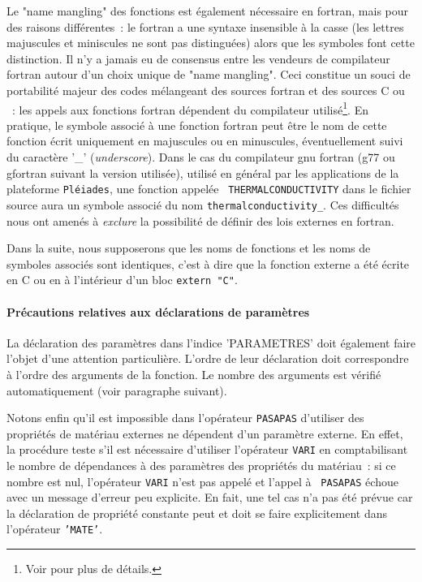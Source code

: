\documentclass[rectoverso,pleiades,pstricks,leqno,anti]{texmf/note_technique_2010}
\def\ifmonospace{\ifdim\fontdimen3\font=0pt }
\def\cpp{%
\ifmonospace%
    C++%
\else%
    C\kern-.1667em\raise.30ex\hbox{\smaller{++}}%
\fi%
\spacefactor1000 }
\begin{document}
Le "name mangling" des fonctions est également nécessaire en fortran,
mais pour des raisons différentes~: le fortran a une syntaxe insensible
à la casse (les lettres majuscules et miniscules ne sont pas
distinguées) alors que les symboles font cette distinction. Il n'y a
jamais eu de consensus entre les vendeurs de compilateur fortran autour
d'un choix unique de "name mangling". Ceci constitue un souci de
portabilité majeur des codes mélangeant des sources fortran et des
sources C ou \cpp~: les appels aux fonctions fortran dépendent du
compilateur utilisé\footnote{Voir \cite{docum_autoc} pour plus de
  détails.}. En pratique, le symbole associé à une fonction fortran peut
être le nom de cette fonction écrit uniquement en majuscules ou en
minuscules, éventuellement suivi du caractère '\_' ({\em underscore}).
Dans le cas du compilateur gnu fortran (g77 ou gfortran suivant la
version utilisée), utilisé en général par les applications de la
plateforme {\tt Pléiades}, une fonction appelée {\tt
  THERMALCONDUCTIVITY} dans le fichier source aura un symbole associé du
nom {\tt thermalconductivity\_}. Ces difficultés nous ont amenés à {\it
  exclure} la possibilité de définir des lois externes en fortran.

Dans la suite, nous supposerons que les noms de fonctions et les noms de
symboles associés sont identiques, c'est à dire que la fonction externe
a été écrite en C ou en \cpp à l'intérieur d'un bloc {\tt extern "C"}.

\paragraph{Précautions relatives aux déclarations de paramètres} La
déclaration des paramètres dans l'indice 'PARAMETRES' doit également
faire l'objet d'une attention particulière. L'ordre de leur déclaration
doit correspondre à l'ordre des arguments de la fonction. Le nombre des
arguments est vérifié automatiquement (voir paragraphe suivant).

Notons enfin qu'il est impossible dans l'opérateur {\tt PASAPAS}
d'utiliser des propriétés de matériau externes ne dépendent d'un
paramètre externe. En effet, la procédure teste s'il est nécessaire
d'utiliser l'opérateur {\tt VARI} en comptabilisant le nombre de
dépendances à des paramètres des propriétés du matériau~: si ce nombre
est nul, l'opérateur {\tt VARI} n'est pas appelé et l'appel à {\tt
  PASAPAS} échoue avec un message d'erreur peu explicite. En fait, une
tel cas n'a pas été prévue car la déclaration de propriété constante
peut et doit se faire explicitement dans l'opérateur {\tt 'MATE'}.
\end{document}
